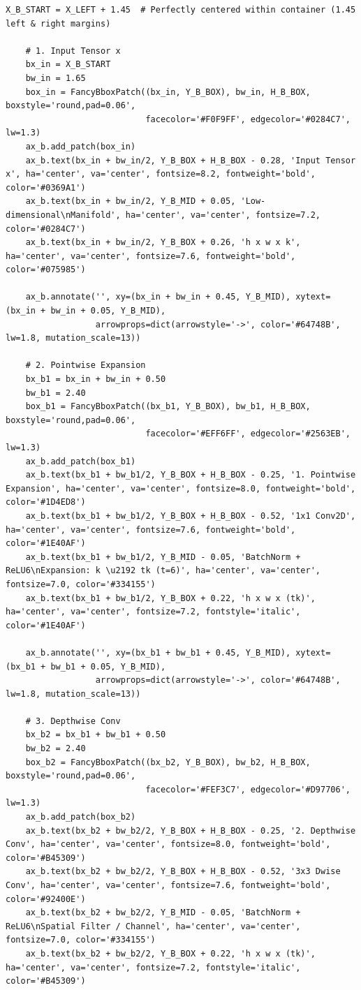 \begin{lstlisting}[style=pycode]
    X_B_START = X_LEFT + 1.45  # Perfectly centered within container (1.45 left & right margins)

    # 1. Input Tensor x
    bx_in = X_B_START
    bw_in = 1.65
    box_in = FancyBboxPatch((bx_in, Y_B_BOX), bw_in, H_B_BOX, boxstyle='round,pad=0.06',
                            facecolor='#F0F9FF', edgecolor='#0284C7', lw=1.3)
    ax_b.add_patch(box_in)
    ax_b.text(bx_in + bw_in/2, Y_B_BOX + H_B_BOX - 0.28, 'Input Tensor x', ha='center', va='center', fontsize=8.2, fontweight='bold', color='#0369A1')
    ax_b.text(bx_in + bw_in/2, Y_B_MID + 0.05, 'Low-dimensional\nManifold', ha='center', va='center', fontsize=7.2, color='#0284C7')
    ax_b.text(bx_in + bw_in/2, Y_B_BOX + 0.26, 'h x w x k', ha='center', va='center', fontsize=7.6, fontweight='bold', color='#075985')

    ax_b.annotate('', xy=(bx_in + bw_in + 0.45, Y_B_MID), xytext=(bx_in + bw_in + 0.05, Y_B_MID),
                  arrowprops=dict(arrowstyle='->', color='#64748B', lw=1.8, mutation_scale=13))

    # 2. Pointwise Expansion
    bx_b1 = bx_in + bw_in + 0.50
    bw_b1 = 2.40
    box_b1 = FancyBboxPatch((bx_b1, Y_B_BOX), bw_b1, H_B_BOX, boxstyle='round,pad=0.06',
                            facecolor='#EFF6FF', edgecolor='#2563EB', lw=1.3)
    ax_b.add_patch(box_b1)
    ax_b.text(bx_b1 + bw_b1/2, Y_B_BOX + H_B_BOX - 0.25, '1. Pointwise Expansion', ha='center', va='center', fontsize=8.0, fontweight='bold', color='#1D4ED8')
    ax_b.text(bx_b1 + bw_b1/2, Y_B_BOX + H_B_BOX - 0.52, '1x1 Conv2D', ha='center', va='center', fontsize=7.6, fontweight='bold', color='#1E40AF')
    ax_b.text(bx_b1 + bw_b1/2, Y_B_MID - 0.05, 'BatchNorm + ReLU6\nExpansion: k \u2192 tk (t=6)', ha='center', va='center', fontsize=7.0, color='#334155')
    ax_b.text(bx_b1 + bw_b1/2, Y_B_BOX + 0.22, 'h x w x (tk)', ha='center', va='center', fontsize=7.2, fontstyle='italic', color='#1E40AF')

    ax_b.annotate('', xy=(bx_b1 + bw_b1 + 0.45, Y_B_MID), xytext=(bx_b1 + bw_b1 + 0.05, Y_B_MID),
                  arrowprops=dict(arrowstyle='->', color='#64748B', lw=1.8, mutation_scale=13))

    # 3. Depthwise Conv
    bx_b2 = bx_b1 + bw_b1 + 0.50
    bw_b2 = 2.40
    box_b2 = FancyBboxPatch((bx_b2, Y_B_BOX), bw_b2, H_B_BOX, boxstyle='round,pad=0.06',
                            facecolor='#FEF3C7', edgecolor='#D97706', lw=1.3)
    ax_b.add_patch(box_b2)
    ax_b.text(bx_b2 + bw_b2/2, Y_B_BOX + H_B_BOX - 0.25, '2. Depthwise Conv', ha='center', va='center', fontsize=8.0, fontweight='bold', color='#B45309')
    ax_b.text(bx_b2 + bw_b2/2, Y_B_BOX + H_B_BOX - 0.52, '3x3 Dwise Conv', ha='center', va='center', fontsize=7.6, fontweight='bold', color='#92400E')
    ax_b.text(bx_b2 + bw_b2/2, Y_B_MID - 0.05, 'BatchNorm + ReLU6\nSpatial Filter / Channel', ha='center', va='center', fontsize=7.0, color='#334155')
    ax_b.text(bx_b2 + bw_b2/2, Y_B_BOX + 0.22, 'h x w x (tk)', ha='center', va='center', fontsize=7.2, fontstyle='italic', color='#B45309')


\end{lstlisting}

